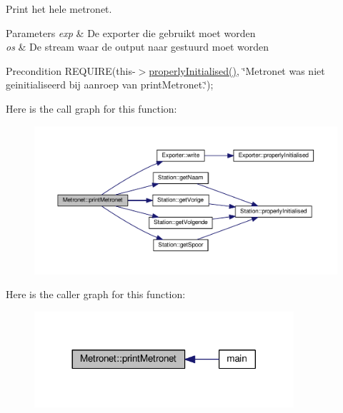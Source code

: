 Print het hele metronet. 


\begin{DoxyParams}{Parameters}
{\em exp} & De exporter die gebruikt moet worden \\
\hline
{\em os} & De stream waar de output naar gestuurd moet worden \\
\hline
\end{DoxyParams}
\begin{DoxyPrecond}{Precondition}
R\+E\+Q\+U\+I\+RE(this-\/$>$\hyperlink{class_metronet_a3d2adce29a947f162924279b766de645}{properly\+Initialised()}, \char`\"{}\+Metronet was niet geinitialiseerd bij aanroep van print\+Metronet.\char`\"{}); 
\end{DoxyPrecond}


Here is the call graph for this function\+:\nopagebreak
\begin{figure}[H]
\begin{center}
\leavevmode
\includegraphics[width=350pt]{class_metronet_a3d8b85c241fff3a9353c06320226e84e_cgraph}
\end{center}
\end{figure}




Here is the caller graph for this function\+:\nopagebreak
\begin{figure}[H]
\begin{center}
\leavevmode
\includegraphics[width=272pt]{class_metronet_a3d8b85c241fff3a9353c06320226e84e_icgraph}
\end{center}
\end{figure}


